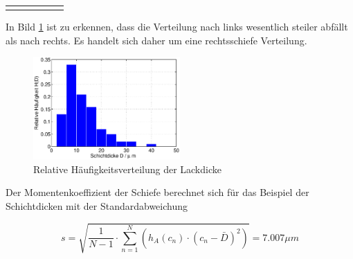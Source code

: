 \begin{table}[H]
{\begin{tabular}{| c | c | c | c | c | c |}
\parbox[c][0.3in][c]{1in}{\centering{}\selectfont{16}} & 
\parbox[c][0.3in][c]{1in}{\centering{}\selectfont{16}} &
\parbox[c][0.3in][c]{1in}{\centering{}\selectfont{0.16}} & 
\parbox[c][0.3in][c]{1in}{\centering{}\selectfont{36}} &
\parbox[c][0.3in][c]{1in}{\centering{}\selectfont{0}} & 
\parbox[c][0.3in][c]{1in}{\centering{}\selectfont{0.00}}\\ \hline

\parbox[c][0.3in][c]{1in}{\centering{}\selectfont{20}} & 
\parbox[c][0.3in][c]{1in}{\centering{}\selectfont{7}} &
\parbox[c][0.3in][c]{1in}{\centering{}\selectfont{0.07}} & 
\parbox[c][0.3in][c]{1in}{\centering{}\selectfont{40}} &
\parbox[c][0.3in][c]{1in}{\centering{}\selectfont{1}} & 
\parbox[c][0.3in][c]{1in}{\centering{}\selectfont{0.01}}\\ \hline

\end{tabular}%
}
\label{tab:threetwenty}
\end{table}

\clearpage

\noindent In Bild \ref{fig:Schichtdicke} ist zu erkennen, dass die Verteilung nach links wesentlich steiler abf\"{a}llt als nach rechts. Es handelt sich daher um eine rechtsschiefe Verteilung.

\noindent 
\begin{figure}[H]
  \centerline{\includegraphics[width=0.5\textwidth]{Kapitel3/Bilder/image11}}
  \caption{Relative H\"{a}ufigkeitsverteilung der Lackdicke}
  \label{fig:Schichtdicke}
\end{figure}

\noindent Der Momentenkoeffizient der Schiefe berechnet sich f\"{u}r das Beispiel der Schichtdicken mit der Standardabweichung

\begin{equation}\label{eq:threefiftynine}
s=\sqrt{\dfrac{1}{N-1} \cdot \sum _{n=1}^{N}\left(h_{A} (c_{n})\cdot (c_{n} -\bar{D})^{2} \right)} =7.007 \mu m
\end{equation} 

